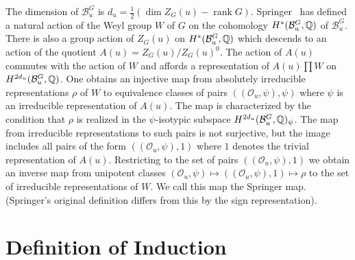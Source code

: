 \documentclass{amsart}
\newcommand\bB{{\mathcal B}}
\newcommand\Bug	{\bB_u^G}
\newcommand\HBug	{H^*(\Bug,\Q)}
\newcommand\cO		{{\mathcal O}}
\newcommand\Ou		{(\cO_u,\psi)}
\newcommand\Q		{{\Bbb Q}}
\newcommand\rank	{\operatorname{rank}}
\begin{document}
The dimension of $\Bug$ is $d_u = \frac 12(\dim Z_G(u) - \rank
G)$.  
Springer~\cites{Spr1,Spr2} has defined a natural action of
the Weyl 
group $W$ of $G$ on the 
cohomology $\HBug$ of $\Bug$.  There is also a group action of
$Z_G(u)$ on
$\HBug$ which descends to an action of the quotient 
$A(u) = Z_G(u) / Z_G(u)^0$.  The action of $A(u)$ commutes with
the action
of $W$ and affords a representation of $A(u) \prod W$ on
$H^{2d_u}(\Bug,\Q)$.  One obtains an injective map from
absolutely irreducible representations $\rho$ of $W$ to
equivalence classes of pairs $(\Ou,\psi)$ where $\psi$ is an
irreducible representation of $A(u)$.  The map is characterized
by the condition that $\rho$ is realized in the $\psi$-isotypic
subspace $H^{2d_u}(\Bug,\Q)_\psi$.  The map from irreducible
representations to such pairs is not surjective, but the image
includes all pairs of the form $(\Ou,1)$ where $1$ denotes the
trivial representation of $A(u)$.  Restricting to the set of
pairs $(\Ou,1)$ we obtain an inverse map from unipotent classes
$\Ou \mapsto (\Ou,1) \mapsto \rho$ to the set of irreducible
representations of $W$.  We call this map the Springer map. 
(Springer's original definition differs from this by the sign
representation).





\section{Definition of Induction} %

\bigskip
\newcommand\sphat{} %
\end{document}
